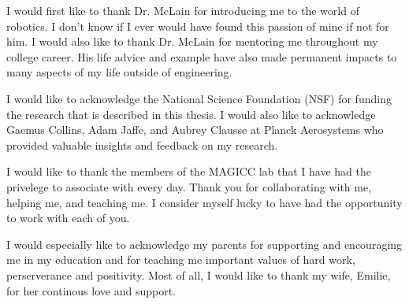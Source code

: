 \afterpage{\cleardoublepage}
%
I would first like to thank Dr. McLain for introducing me to the world of robotics. I
don't know if I ever would have found this passion of mine if not for him. I would also
like to thank Dr. McLain for mentoring me throughout my college career. His life
advice and example have also made permanent impacts to many
aspects of my life outside of engineering.

I would like to acknowledge the National Science Foundation (NSF) for funding
the research that is described in this thesis. I would also like to acknowledge
Gaemus Collins, Adam Jaffe, and Aubrey Clausse at Planck Aerosystems who provided valuable insights and feedback
on my research.

I would like to thank the members of the MAGICC lab that I
have had the privelege to associate with every day. Thank you for collaborating
with me, helping me, and teaching me. I consider myself lucky to have had the
opportunity to work with each of you.

I would especially like to acknowledge my parents for supporting and
encouraging me in my education and for teaching me important values of hard
work, perserverance and positivity. Most of all, I would like to thank my wife, Emilie, for
her continous love and support.
